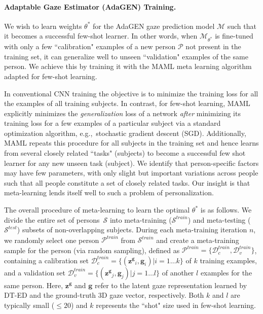 \documentclass[10pt,twocolumn,letterpaper]{article}
\def\eg{e.g.,~}
\begin{document}
\paragraph{Adaptable Gaze Estimator (AdaGEN) Training.\label{sec:MAML}}
We wish to learn weights $\theta^*$ for the AdaGEN gaze prediction model $\mathcal{M}$ such that it becomes a  successful few-shot learner. In other words, when $\mathcal{M}_{\theta^*}$ is fine-tuned with only a few ``calibration" examples of a new person $\mathcal{P}$ not present in the training set, it can generalize well to unseen ``validation" examples of the same person. We achieve this by training it with the MAML  meta learning algorithm adapted for few-shot learning. 

In conventional CNN training the objective is to minimize the training loss for all the examples of all training subjects. In contrast, for few-shot learning, MAML explicitly minimizes the \emph{generalization} loss of a network \emph{after} minimizing its training loss for a few examples of a particular subject via a standard optimization algorithm, \eg stochastic gradient descent (SGD). Additionally, MAML repeats this procedure for all subjects in the training set and hence learns from several closely related ``tasks" (subjects) to become a successful few shot learner for any new unseen task (subject). We identify that person-specific factors may have few parameters, with only slight but important variations across people such that all people constitute a set of closely related tasks. Our insight is that meta-learning lends itself well to such a problem of personalization.





The overall procedure of meta-learning to learn the optimal $\theta^*$ is as follows. 
We divide the entire set of persons~$\mathcal{S}$ into meta-training ($\mathcal{S}^{train}$) and meta-testing ($\mathcal{S}^{test}$) subsets of non-overlapping subjects.
During each meta-training iteration $n$, we randomly select one person $\mathcal{P}^{train}$ from $\mathcal{S}^{train}$ and create a meta-training sample for the person (via random sampling), defined as $\mathcal{P}^{train}=\{\mathcal{D}_c^{train},\mathcal{D}_v^{train}\}$, containing a calibration set $\mathcal{D}_c^{train} = \{(\mathbf{z^g}_i, \mathbf{g}_i) | i = 1 \ldots k\}$ of $k$ training examples, and a validation set $\mathcal{D}_v^{train} = \{(\mathbf{z^g}_j, \mathbf{g}_j) | j = 1 \ldots l\}$ of another $l$ examples for the same person.
Here, $\mathbf{z^g}$ and $\mathbf{g}$ refer to the latent gaze representation learned by DT-ED and the ground-truth 3D gaze vector, respectively. 
Both $k$ and $l$ are typically small ($\leq20$) and $k$ represents the ``shot" size used in few-shot learning.
\end{document}
